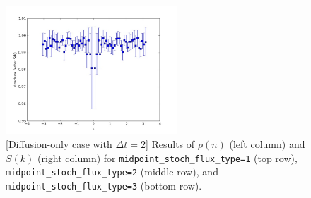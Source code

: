 \documentclass{article}
\begin{document}
\begin{figure}
\includegraphics[width=0.5\linewidth,height=1.9in]{fig1/diff_dt2_Sk_mid3.jpg}
\caption{\label{fig_diff_dt2_mid_type}[Diffusion-only case with $\Delta t=2$] Results of $\rho(n)$ (left column) and $S(k)$ (right column) for \texttt{midpoint\_stoch\_flux\_type=1} (top row), \texttt{midpoint\_stoch\_flux\_type=2} (middle row), and \texttt{midpoint\_stoch\_flux\_type=3} (bottom row).
}
\end{figure}
\end{document}
